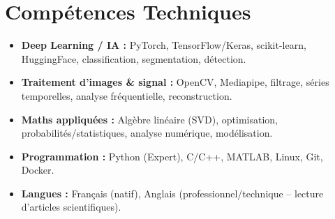 \documentclass[a4paper,11pt]{article}
\begin{document}
\section{Compétences Techniques}
\begin{itemize}[leftmargin=*, nosep]
    \item \small{\textbf{Deep Learning / IA :} PyTorch, TensorFlow/Keras, scikit-learn, HuggingFace, classification, segmentation, détection.}
    \item \small{\textbf{Traitement d'images \& signal :} OpenCV, Mediapipe, filtrage, séries temporelles, analyse fréquentielle, reconstruction.}
    \item \small{\textbf{Maths appliquées :} Algèbre linéaire (SVD), optimisation, probabilités/statistiques, analyse numérique, modélisation.}
    \item \small{\textbf{Programmation :} Python (Expert), C/C++, MATLAB, Linux, Git, Docker.}
    \item \small{\textbf{Langues :} Français (natif), Anglais (professionnel/technique -- lecture d'articles scientifiques).}
\end{itemize}

\end{document}
